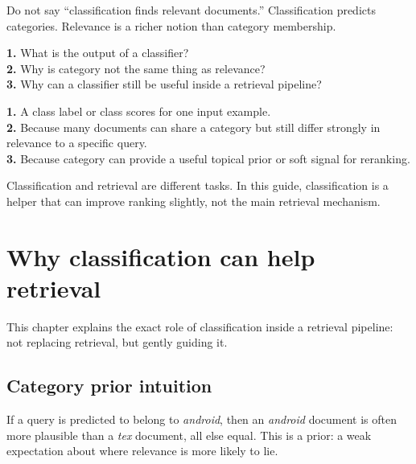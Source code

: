 \documentclass[11pt,oneside]{report}
\begin{document}
\begin{warningbox}
Do not say ``classification finds relevant documents.'' Classification predicts categories. Relevance is a richer notion than category membership.
\end{warningbox}

\begin{selfcheckbox}
\textbf{1.} What is the output of a classifier?\\
\textbf{2.} Why is category not the same thing as relevance?\\
\textbf{3.} Why can a classifier still be useful inside a retrieval pipeline?
\end{selfcheckbox}

\begin{answerbox}
\textbf{1.} A class label or class scores for one input example.\\
\textbf{2.} Because many documents can share a category but still differ strongly in relevance to a specific query.\\
\textbf{3.} Because category can provide a useful topical prior or soft signal for reranking.
\end{answerbox}

\begin{rememberbox}
Classification and retrieval are different tasks. In this guide, classification is a helper that can improve ranking slightly, not the main retrieval mechanism.
\end{rememberbox}


\chapter[Why Classification Helps Retrieval]{Why classification can help retrieval}

\begin{purposebox}
This chapter explains the exact role of classification inside a retrieval pipeline: not replacing retrieval, but gently guiding it.
\end{purposebox}

\section*{Category prior intuition}
If a query is predicted to belong to \emph{android}, then an \emph{android} document is often more plausible than a \emph{tex} document, all else equal. This is a prior: a weak expectation about where relevance is more likely to lie.
\end{document}
